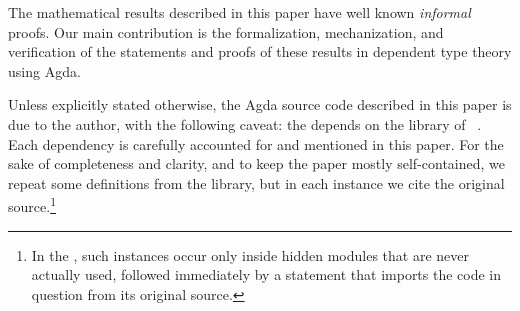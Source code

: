
The mathematical results described in this paper have well known \emph{informal} proofs. Our main contribution is the formalization, mechanization, and verification of the statements and proofs of these results in dependent type theory using Agda.

Unless explicitly stated otherwise, the Agda source code described in this paper is due to the author, with the following caveat: the \ualib depends on the \typetopology library of \MartinEscardo~\cite{MHE}.  Each dependency is carefully accounted for and mentioned in this paper. For the sake of completeness and clarity, and to keep the paper mostly self-contained, we repeat some definitions from the \typetopology library, but in each instance we cite the original source.\footnote{In the \ualib, such instances occur only inside hidden modules that are never actually used, followed immediately by a statement that imports the code in question from its original source.}
